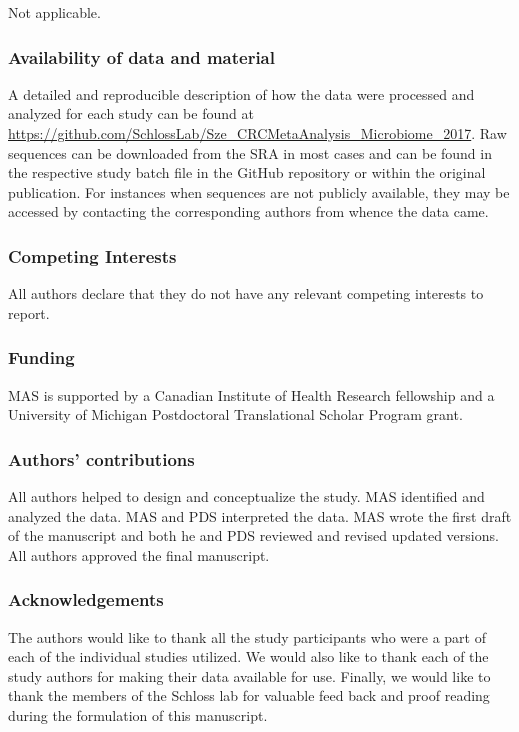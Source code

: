\documentclass[12pt,]{article}
\begin{document}
Not applicable.

\subsubsection{Availability of data and
material}\label{availability-of-data-and-material}

A detailed and reproducible description of how the data were processed
and analyzed for each study can be found at
\url{https://github.com/SchlossLab/Sze_CRCMetaAnalysis_Microbiome_2017}.
Raw sequences can be downloaded from the SRA in most cases and can be
found in the respective study batch file in the GitHub repository or
within the original publication. For instances when sequences are not
publicly available, they may be accessed by contacting the corresponding
authors from whence the data came.

\subsubsection{Competing Interests}\label{competing-interests}

All authors declare that they do not have any relevant competing
interests to report.

\subsubsection{Funding}\label{funding}

MAS is supported by a Canadian Institute of Health Research fellowship
and a University of Michigan Postdoctoral Translational Scholar Program
grant.

\subsubsection{Authors' contributions}\label{authors-contributions}

All authors helped to design and conceptualize the study. MAS identified
and analyzed the data. MAS and PDS interpreted the data. MAS wrote the
first draft of the manuscript and both he and PDS reviewed and revised
updated versions. All authors approved the final manuscript.

\subsubsection{Acknowledgements}\label{acknowledgements}

The authors would like to thank all the study participants who were a
part of each of the individual studies utilized. We would also like to
thank each of the study authors for making their data available for use.
Finally, we would like to thank the members of the Schloss lab for
valuable feed back and proof reading during the formulation of this
manuscript.
\end{document}
